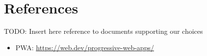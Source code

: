 \section{References}
TODO: Insert here reference to documents supporting our choices
\begin{itemize}
    \item PWA: \url{https://web.dev/progressive-web-apps/}
\end{itemize}